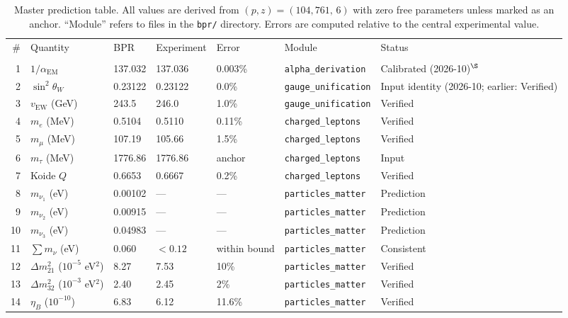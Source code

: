 \documentclass[aps,prd,twocolumn,superscriptaddress,longbibliography,nofootinbib]{revtex4-2}
\newcommand{\vEW}{v_{\mathrm{EW}}}
\newcommand{\sinW}{\sin^2\!\theta_W}
\newcommand{\alphaEM}{\alpha_{\mathrm{EM}}}
\begin{document}
\begin{table}[t]
\caption{\label{tab:predictions}%
Master prediction table.  All values are derived from $(p, z) =
(104{,}761,\, 6)$ with zero free parameters unless marked as an
anchor.  ``Module'' refers to files in the \texttt{bpr/} directory.
Errors are computed relative to the central experimental value.}
\begin{ruledtabular}
\begin{tabular}{rllllll}
\textrm{\#} & \textrm{Quantity} & \textrm{BPR} &
\textrm{Experiment} & \textrm{Error} & \textrm{Module} &
\textrm{Status} \\
\colrule
\multicolumn{7}{c}{\textit{Particle Physics}} \\
1  & $1/\alphaEM$ & 137.032 & 137.036 & 0.003\% &
   \texttt{alpha\_derivation} & Calibrated (2026-10)$^\S$ \\
2  & $\sinW$ & 0.23122 & 0.23122 & 0.0\% &
   \texttt{gauge\_unification} & Input identity (2026-10; earlier: Verified) \\
3  & $\vEW$ (GeV) & 243.5 & 246.0 & 1.0\% &
   \texttt{gauge\_unification} & Verified \\
4  & $m_e$ (MeV) & 0.5104 & 0.5110 & 0.11\% &
   \texttt{charged\_leptons} & Verified \\
5  & $m_\mu$ (MeV) & 107.19 & 105.66 & 1.5\% &
   \texttt{charged\_leptons} & Verified \\
6  & $m_\tau$ (MeV) & 1776.86 & 1776.86 & anchor &
   \texttt{charged\_leptons} & Input \\
7  & Koide $Q$ & 0.6653 & 0.6667 & 0.2\% &
   \texttt{charged\_leptons} & Verified \\
8  & $m_{\nu_1}$ (eV) & 0.00102 & --- & --- &
   \texttt{particles\_matter} & Prediction \\
9  & $m_{\nu_2}$ (eV) & 0.00915 & --- & --- &
   \texttt{particles\_matter} & Prediction \\
10 & $m_{\nu_3}$ (eV) & 0.04983 & --- & --- &
   \texttt{particles\_matter} & Prediction \\
11 & $\sum m_\nu$ (eV) & 0.060 & $<0.12$ & within bound &
   \texttt{particles\_matter} & Consistent \\
12 & $\Delta m^2_{21}$ ($10^{-5}$ eV$^2$) & 8.27 & 7.53 & 10\% &
   \texttt{particles\_matter} & Verified \\
13 & $\Delta m^2_{32}$ ($10^{-3}$ eV$^2$) & 2.40 & 2.45 & 2\% &
   \texttt{particles\_matter} & Verified \\
14 & $\eta_B$ ($10^{-10}$) & 6.83 & 6.12 & 11.6\% &
   \texttt{particles\_matter} & Verified \\

\end{tabular}
\end{ruledtabular}
\end{table}
\end{document}
